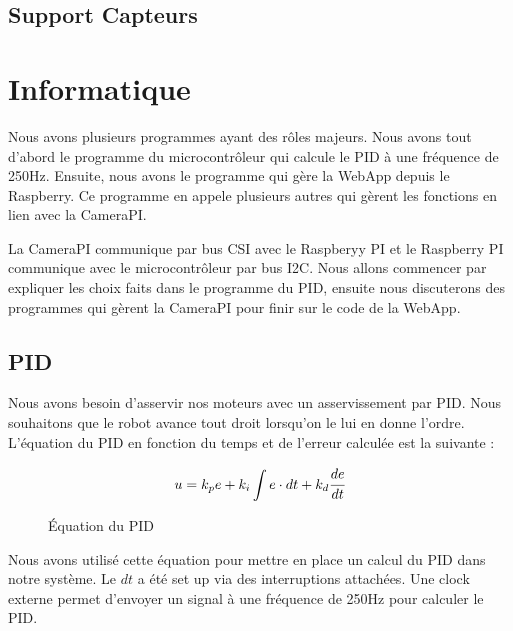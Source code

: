 \documentclass[
	a4paper,									%
	11pt,										%
	twoside,									%
	openright,									%
	notitlepage,									%
	parskip=half,								%
]{scrreprt}										%
\begin{document}
\section{Support Capteurs}




\chapter{Informatique}

Nous avons plusieurs programmes ayant des rôles majeurs. Nous avons tout d'abord le programme du 
microcontrôleur qui calcule le PID à une fréquence de 250Hz. Ensuite, nous avons le programme qui gère
la WebApp depuis le Raspberry. Ce programme en appele plusieurs autres qui gèrent les fonctions en lien 
avec la CameraPI. \par

La CameraPI communique par bus CSI avec le Raspberyy PI et le Raspberry PI communique avec le microcontrôleur
par bus I2C. Nous allons commencer par expliquer les choix faits dans le programme du PID, ensuite nous discuterons
des programmes qui gèrent la CameraPI pour finir sur le code de la WebApp. \par


\section{PID}

Nous avons besoin d'asservir nos moteurs avec un asservissement par PID. Nous souhaitons que le robot avance
tout droit lorsqu'on le lui en donne l'ordre. L'équation du PID en fonction du temps et de l'erreur calculée 
est la suivante : 

\begin{figure}[h]
	\[u=k_pe + k_i \int e \cdot dt + k_d \cfrac{de}{dt}\] 
	\caption{Équation du PID}
	\label{eq1}
\end{figure}

Nous avons utilisé cette équation pour mettre en place un calcul du PID dans notre système. Le $dt$ a été 
set up via des interruptions attachées. Une clock externe permet d'envoyer un signal à une fréquence de 250Hz
pour calculer le PID. \par
\end{document}
